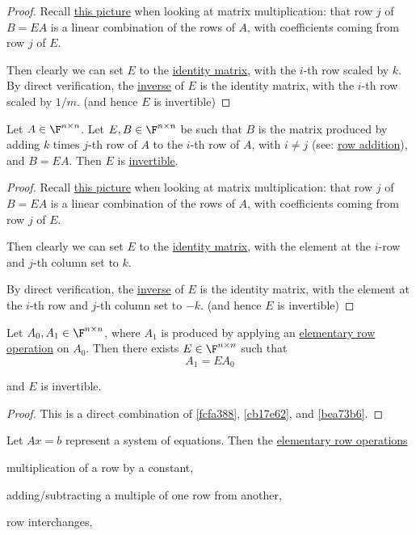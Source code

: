 \begin{proof}
  Recall \href{a9e7369}{this picture} when looking at matrix multiplication:
  that row $j$ of $B=EA$ is a linear combination of the rows of $A$, with
  coefficients coming from row $j$ of $E$.

  Then clearly we can set $E$ to the \href{dcfd9cd}{identity matrix}, with the
  $i$-th row scaled by $k$. By direct verification, the \href{ce4daa8}{inverse}
  of $E$ is the identity matrix, with the $i$-th row scaled by $1/m$. (and
  hence $E$ is invertible)
\end{proof}

\label{bea73b6}

Let $A\in\F^{n\times n}$. Let $E,B\in\F^{n\times n}$ be such that $B$ is the
matrix produced by adding $k$ times $j$-th row of $A$ to the $i$-th row of $A$,
with $i\neq j$ (see: \href{d7fc6d0}{row addition}), and $B=EA$. Then $E$ is
\href{ce4daa8}{invertible}.

\begin{proof}
  Recall \href{a9e7369}{this picture} when looking at matrix multiplication:
  that row $j$ of $B=EA$ is a linear combination of the rows of $A$, with
  coefficients coming from row $j$ of $E$.

  Then clearly we can set $E$ to the \href{dcfd9cd}{identity matrix}, with the
  element at the $i$-row and $j$-th column set to $k$.

  By direct verification, the \href{ce4daa8}{inverse} of $E$ is the identity
  matrix, with the element at the $i$-th row and $j$-th column set to $-k$.
  (and hence $E$ is invertible)
\end{proof}

\label{bd1dfdd}

Let $A_0,A_1\in\F^{n\times n}$, where $A_1$ is produced by applying an
\href{d7fc6d0}{elementary row operation} on $A_0$. Then there exists
$E\in\F^{n\times n}$ such that
$$
  A_1=EA_0
$$

and $E$ is invertible.

\begin{proof}
  This is a direct combination of \autoref{fcfa388}, \autoref{cb17e62}, and
  \autoref{bea73b6}.
\end{proof}

\label{fd54a50}

Let $Ax=b$ represent a system of equations. Then the \href{d7fc6d0}{elementary
row operations}
\begin{enumerati}
  \item multiplication of a row by a constant,
  \item adding/subtracting a multiple of one row from another,
  \item row interchanges,
\end{enumerati}

